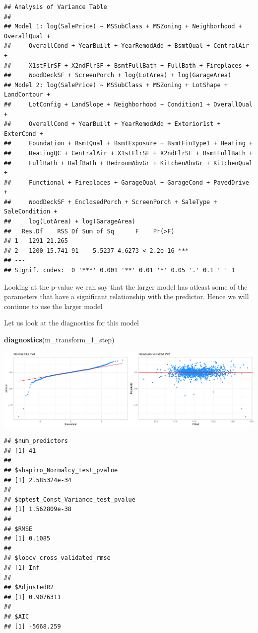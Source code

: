 \documentclass[
]{article}
\newenvironment{Shaded}{\begin{snugshade}}{\end{snugshade}}
\newcommand{\DecValTok}[1]{\textcolor[rgb]{0.00,0.00,0.81}{#1}}
\newcommand{\KeywordTok}[1]{\textcolor[rgb]{0.13,0.29,0.53}{\textbf{#1}}}
\newcommand{\NormalTok}[1]{#1}
\begin{document}
\begin{verbatim}
## Analysis of Variance Table
## 
## Model 1: log(SalePrice) ~ MSSubClass + MSZoning + Neighborhood + OverallQual + 
##     OverallCond + YearBuilt + YearRemodAdd + BsmtQual + CentralAir + 
##     X1stFlrSF + X2ndFlrSF + BsmtFullBath + FullBath + Fireplaces + 
##     WoodDeckSF + ScreenPorch + log(LotArea) + log(GarageArea)
## Model 2: log(SalePrice) ~ MSSubClass + MSZoning + LotShape + LandContour + 
##     LotConfig + LandSlope + Neighborhood + Condition1 + OverallQual + 
##     OverallCond + YearBuilt + YearRemodAdd + Exterior1st + ExterCond + 
##     Foundation + BsmtQual + BsmtExposure + BsmtFinType1 + Heating + 
##     HeatingQC + CentralAir + X1stFlrSF + X2ndFlrSF + BsmtFullBath + 
##     FullBath + HalfBath + BedroomAbvGr + KitchenAbvGr + KitchenQual + 
##     Functional + Fireplaces + GarageQual + GarageCond + PavedDrive + 
##     WoodDeckSF + EnclosedPorch + ScreenPorch + SaleType + SaleCondition + 
##     log(LotArea) + log(GarageArea)
##   Res.Df    RSS Df Sum of Sq      F    Pr(>F)    
## 1   1291 21.265                                  
## 2   1200 15.741 91    5.5237 4.6273 < 2.2e-16 ***
## ---
## Signif. codes:  0 '***' 0.001 '**' 0.01 '*' 0.05 '.' 0.1 ' ' 1
\end{verbatim}

Looking at the p-value we can say that the larger model has atleast some of the parameters that have a significant relationship with the predictor. Hence we will continue to use the larger model

Let us look at the diagnostics for this model

\begin{Shaded}
\begin{Highlighting}[]
\KeywordTok{diagnostics}\NormalTok{(m_transform_}\DecValTok{1}\NormalTok{_step)}
\end{Highlighting}
\end{Shaded}

\includegraphics{Project_files/figure-latex/unnamed-chunk-35-1.pdf}

\begin{verbatim}
## $num_predictors
## [1] 41
## 
## $shapiro_Normalcy_test_pvalue
## [1] 2.585324e-34
## 
## $bptest_Const_Variance_test_pvalue
## [1] 1.562809e-38
## 
## $RMSE
## [1] 0.1085
## 
## $loocv_cross_validated_rmse
## [1] Inf
## 
## $AdjustedR2
## [1] 0.9076311
## 
## $AIC
## [1] -5668.259
\end{verbatim}
\end{document}
